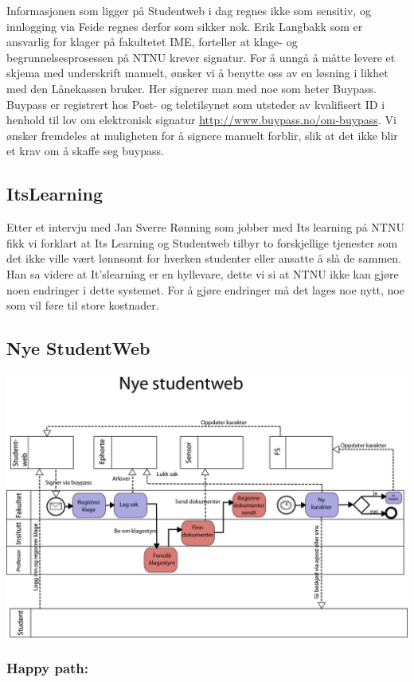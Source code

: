 \documentclass[12pt]{article}
\begin{document}
Informasjonen som ligger på Studentweb i dag regnes ikke som sensitiv, og innlogging via Feide regnes derfor som sikker nok. Erik Langbakk som er ansvarlig for klager på fakultetet IME, forteller at klage- og begrunnelsesprosessen på NTNU krever signatur. For å unngå å måtte levere et skjema med underskrift manuelt, ønsker vi å benytte oss av en løsning i likhet med den Lånekassen bruker. Her signerer man med noe som heter Buypass. Buypass er registrert hos Post- og teletilsynet som utsteder av kvalifisert ID i henhold til lov om elektronisk signatur \url{http://www.buypass.no/om-buypass}. Vi ønsker fremdeles at muligheten for å signere manuelt forblir, slik at det ikke blir et krav om å skaffe seg buypass.


\subsection*{ItsLearning}
Etter et intervju med Jan Sverre Rønning som jobber med Its learning på NTNU fikk vi forklart at Its Learning og Studentweb tilbyr to forskjellige tjenester som det ikke ville vært lønnsomt for hverken studenter eller ansatte å slå de sammen. Han sa videre at It’slearning er en hyllevare, dette vi si at NTNU ikke kan gjøre noen endringer i dette systemet. For å gjøre endringer må det lages noe nytt, noe som vil føre til store kostnader.


\subsection{Nye StudentWeb}

\includegraphics[width=0.9 \textwidth]{nyestudentweb}

\subsubsection*{Happy path:}
\end{document}
